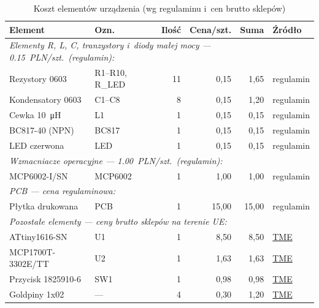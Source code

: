 \documentclass[a4paper,11pt]{article}
\begin{document}
\begin{table}[H]
    \centering
    \caption{Koszt elementów urządzenia (wg regulaminu i~cen brutto sklepów)}
    \label{tab:koszty}
    \begin{tabular}{llrrrl}
        \toprule
        \textbf{Element} & \textbf{Ozn.} & \textbf{Ilość} &
        \textbf{Cena/szt.} & \textbf{Suma} & \textbf{Źródło} \\
        \midrule
        \multicolumn{6}{l}{\textit{Elementy R, L, C, tranzystory i~diody małej mocy --- \SI{0,15}{PLN}/szt.\ (regulamin):}} \\
        \midrule
        Rezystory 0603 & R1--R10, R\_LED & 11 & 0,15 & 1,65 & regulamin \\
        Kondensatory 0603 & C1--C8 & 8 & 0,15 & 1,20 & regulamin \\
        Cewka \SI{10}{\micro\henry} & L1 & 1 & 0,15 & 0,15 & regulamin \\
        BC817-40 (NPN) & BC817 & 1 & 0,15 & 0,15 & regulamin \\
        LED czerwona & LED & 1 & 0,15 & 0,15 & regulamin \\
        \midrule
        \multicolumn{6}{l}{\textit{Wzmacniacze operacyjne --- \SI{1,00}{PLN}/szt.\ (regulamin):}} \\
        \midrule
        MCP6002-I/SN & MCP6002 & 1 & 1,00 & 1,00 & regulamin \\
        \midrule
        \multicolumn{6}{l}{\textit{PCB --- cena regulaminowa:}} \\
        \midrule
        Płytka drukowana & PCB & 1 & 15,00 & 15,00 & regulamin \\
        \midrule
        \multicolumn{6}{l}{\textit{Pozostałe elementy --- ceny brutto sklepów na terenie UE:}} \\
        \midrule
        ATtiny1616-SN & U1 & 1 & 8,50 & 8,50 &
            \href{https://www.tme.eu/pl/details/attiny1616-snr/mikrokontrolery-microchip-avr-8-bit/microchip-technology/}{TME} \\
        MCP1700T-3302E/TT & U2 & 1 & 1,63 & 1,63 &
            \href{https://www.tme.eu/pl/details/mcp1700t-3302e_tt/stabilizatory-ldo-nienastawne/microchip-technology/}{TME} \\
        Przycisk 1825910-6 & SW1 & 1 & 0,98 & 0,98 &
            \href{https://www.tme.eu/pl/details/1825910-6/przelaczniki-tact/te-connectivity/}{TME} \\
        Goldpiny 1x02 & --- & 4 & 0,30 & 1,20 &
            \href{https://www.tme.eu/pl/}{TME} \\

\end{tabular}
\end{table}
\end{document}
